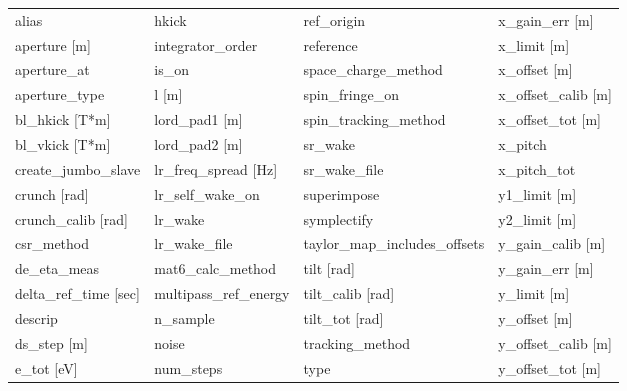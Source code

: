  \begin{tabular}{llll} \toprule
alias                          & hkick                          & ref_origin                     & x_gain_err [m]                 \\
aperture [m]                   & integrator_order               & reference                      & x_limit [m]                    \\
aperture_at                    & is_on                          & space_charge_method            & x_offset [m]                   \\
aperture_type                  & l [m]                          & spin_fringe_on                 & x_offset_calib [m]             \\
bl_hkick [T*m]                 & lord_pad1 [m]                  & spin_tracking_method           & x_offset_tot [m]               \\
bl_vkick [T*m]                 & lord_pad2 [m]                  & sr_wake                        & x_pitch                        \\
create_jumbo_slave             & lr_freq_spread [Hz]            & sr_wake_file                   & x_pitch_tot                    \\
crunch [rad]                   & lr_self_wake_on                & superimpose                    & y1_limit [m]                   \\
crunch_calib [rad]             & lr_wake                        & symplectify                    & y2_limit [m]                   \\
csr_method                     & lr_wake_file                   & taylor_map_includes_offsets    & y_gain_calib [m]               \\
de_eta_meas                    & mat6_calc_method               & tilt [rad]                     & y_gain_err [m]                 \\
delta_ref_time [sec]           & multipass_ref_energy           & tilt_calib [rad]               & y_limit [m]                    \\
descrip                        & n_sample                       & tilt_tot [rad]                 & y_offset [m]                   \\
ds_step [m]                    & noise                          & tracking_method                & y_offset_calib [m]             \\
e_tot [eV]                     & num_steps                      & type                           & y_offset_tot [m]               \\

\end{tabular}
